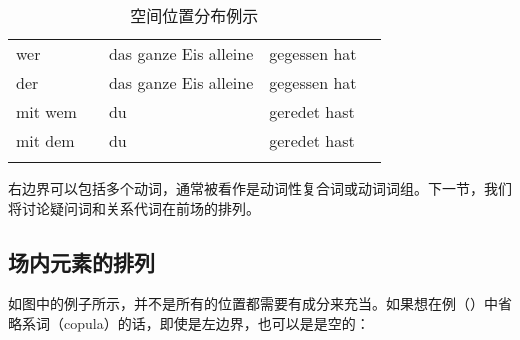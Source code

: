 \begin{table}
\begin{sideways}
\begin{tabular}{lllll}
wer     &               & das ganze Eis alleine                  & gegessen hat \\
der     &               & das ganze Eis alleine                  & gegessen hat \\
mit wem &               & du                                     & geredet hast\\
mit dem &               & du                                     & geredet hast\\\lspbottomrule
\end{tabular}
\end{sideways}
\caption{\label{bsp-topo}空间位置分布例示}
\end{table}
右边界可以包括多个动词，通常被看作是动词性复合词或动词词组。下一节，我们将讨论疑问词和关系代词在前场的排列。

\subsection{场内元素的排列}

如图中的例子所示，并不是所有的位置都需要有成分来充当。如果想在例（）中省略系词（copula）的话，即使是左边界，也可以是是空的：
\eal
\ex

